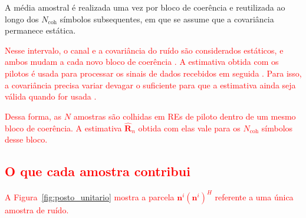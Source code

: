 A média amostral é realizada uma vez por bloco de coerência e reutilizada ao longo dos $N_{\text{coh}}$ símbolos subsequentes, em que se assume que a covariância permanece estática.  

\textcolor{red}{Nesse intervalo, o canal e a covariância do ruído são considerados estáticos, e ambos mudam a cada novo bloco de coerência \cite{zhao2025jsac}. A estimativa obtida com os pilotos é usada para processar os sinais de dados recebidos em seguida \cite{tomasin-interference}. Para isso, a covariância precisa variar devagar o suficiente para que a estimativa ainda seja válida quando for usada \cite{barriac-madhow}.}

\textcolor{red}{Dessa forma, as $N$ amostras são colhidas em REs de piloto dentro de um mesmo bloco de coerência. A estimativa $\hat{\mathbf{R}}_n$ obtida com elas vale para os $N_{\text{coh}}$ símbolos desse bloco.}


\subsection{\texorpdfstring{\textcolor{red}{O que cada amostra contribui}}{O que cada amostra contribui}}

\textcolor{red}{A Figura~{\hypersetup{linkcolor=red}\ref{fig:posto_unitario}} mostra a parcela $\mathbf{n}^i(\mathbf{n}^i)^H$ referente a uma única amostra de ruído.}

